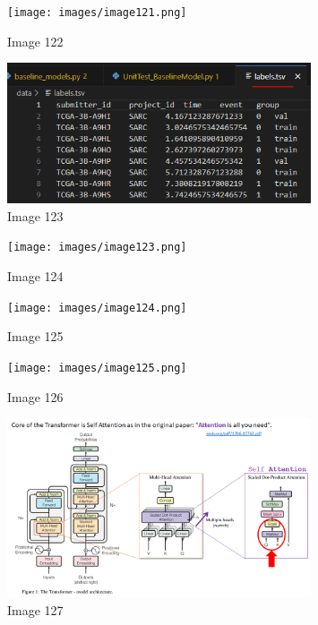 \documentclass{article}%
\begin{document}
%


\begin{figure}[h!]%
\centering%
\texttt{[image: images/image121.png]}%
\caption{Image 122}%
\end{figure}

%


\begin{figure}[h!]%
\centering%
\includegraphics[width=0.8\textwidth]{images/image122.png}%
\caption{Image 123}%
\end{figure}

%


\begin{figure}[h!]%
\centering%
\texttt{[image: images/image123.png]}%
\caption{Image 124}%
\end{figure}

%


\begin{figure}[h!]%
\centering%
\texttt{[image: images/image124.png]}%
\caption{Image 125}%
\end{figure}

%


\begin{figure}[h!]%
\centering%
\texttt{[image: images/image125.png]}%
\caption{Image 126}%
\end{figure}

%


\begin{figure}[h!]%
\centering%
\includegraphics[width=0.8\textwidth]{images/image126.png}%
\caption{Image 127}%
\end{figure}
\end{document}
